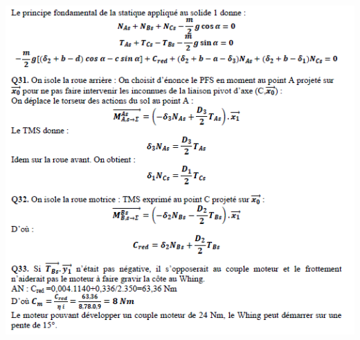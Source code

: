 \documentclass[10pt,fleqn]{article} %
\begin{document}
\begin{center}
\includegraphics[width=\linewidth]{images/cor_02}
\end{center}
\end{document}
